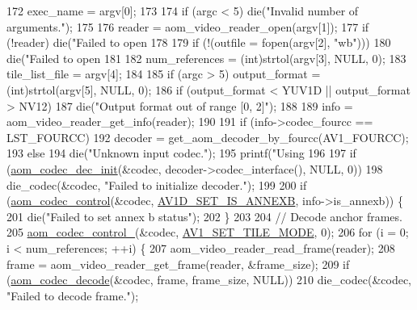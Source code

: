 \begin{DoxyCodeInclude}
{172   exec\_name = argv[0];
173 
174   \textcolor{keywordflow}{if} (argc < 5) die(\textcolor{stringliteral}{"Invalid number of arguments."});
175 
176   reader = aom\_video\_reader\_open(argv[1]);
177   \textcolor{keywordflow}{if} (!reader) die(\textcolor{stringliteral}{"Failed to open %
178 
179   \textcolor{keywordflow}{if} (!(outfile = fopen(argv[2], \textcolor{stringliteral}{"wb"})))
180     die(\textcolor{stringliteral}{"Failed to open %
181 
182   num\_references = (int)strtol(argv[3], NULL, 0);
183   tile\_list\_file = argv[4];
184 
185   \textcolor{keywordflow}{if} (argc > 5) output\_format = (int)strtol(argv[5], NULL, 0);
186   \textcolor{keywordflow}{if} (output\_format < YUV1D || output\_format > NV12)
187     die(\textcolor{stringliteral}{"Output format out of range [0, 2]"});
188 
189   info = aom\_video\_reader\_get\_info(reader);
190 
191   \textcolor{keywordflow}{if} (info->codec\_fourcc == LST\_FOURCC)
192     decoder = get\_aom\_decoder\_by\_fourcc(AV1\_FOURCC);
193   \textcolor{keywordflow}{else}
194     die(\textcolor{stringliteral}{"Unknown input codec."});
195   printf(\textcolor{stringliteral}{"Using %
196 
197   \textcolor{keywordflow}{if} (\hyperlink{group__decoder_gafdbfca65b19ab1f6d72b32cd01753b9b}{aom\_codec\_dec\_init}(&codec, decoder->codec\_interface(), NULL, 0))
198     die\_codec(&codec, \textcolor{stringliteral}{"Failed to initialize decoder."});
199 
200   \textcolor{keywordflow}{if} (\hyperlink{group__codec_ga6da974f4eeaba1fa74106b28d0fe6ac5}{aom\_codec\_control}(&codec, \hyperlink{group__aom__decoder_gga3865fd4b3192489baa9a5c3632ebe97ba1fb269c5c5913d9995b6c35d28e2a788}{AV1D\_SET\_IS\_ANNEXB}, info->is\_annexb)) \{
201     die(\textcolor{stringliteral}{"Failed to set annex b status"});
202   \}
203 
204   \textcolor{comment}{// Decode anchor frames.}
205   \hyperlink{group__codec_ga51eb332a40dcacc39000ab8e0be36b79}{aom\_codec\_control\_}(&codec, \hyperlink{group__aom__decoder_gga3865fd4b3192489baa9a5c3632ebe97ba0795d8084ae8c78528c01587198df9e2}{AV1\_SET\_TILE\_MODE}, 0);
206   \textcolor{keywordflow}{for} (i = 0; i < num\_references; ++i) \{
207     aom\_video\_reader\_read\_frame(reader);
208     frame = aom\_video\_reader\_get\_frame(reader, &frame\_size);
209     \textcolor{keywordflow}{if} (\hyperlink{group__decoder_gab03fdb999d1f83a5896869a3ba5f68f7}{aom\_codec\_decode}(&codec, frame, frame\_size, NULL))
210       die\_codec(&codec, \textcolor{stringliteral}{"Failed to decode frame."});
}}}}
\end{DoxyCodeInclude}
